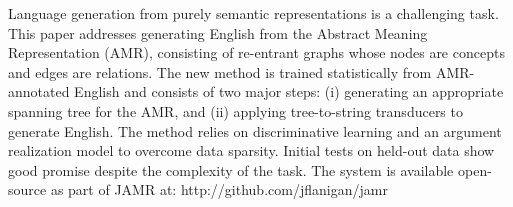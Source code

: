 Language generation from purely semantic representations is a challenging task. This paper addresses generating English from the Abstract Meaning Representation (AMR), consisting of re-entrant graphs whose nodes are concepts and edges are relations. The new method is trained statistically from AMR-annotated English and consists of two major steps: (i) generating an appropriate spanning tree for the AMR, and (ii) applying tree-to-string transducers to generate English. The method relies on discriminative learning and an argument realization model to overcome data sparsity. Initial tests on held-out data show good promise despite the complexity of the task. The system is available open-source as part of JAMR at: http://github.com/jflanigan/jamr
